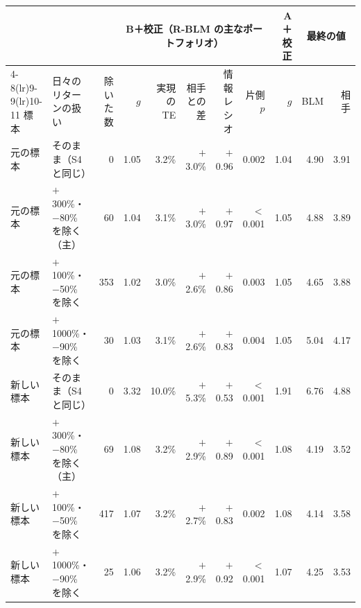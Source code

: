 \begin{tabular}{@{}ll r rrrrr r rr@{}}
\toprule
 & & & \multicolumn{5}{c}{B＋校正（R-BLM の主なポートフォリオ）} & A＋校正 & \multicolumn{2}{c}{最終の値} \\
\cmidrule(lr){4-8}\cmidrule(lr){9-9}\cmidrule(lr){10-11}
標本 & 日々のリターンの扱い & 除いた数 & $g$ & 実現の TE & 相手との差 & 情報レシオ & 片側 $p$ & $g$ & BLM & 相手 \\
\midrule
元の標本 & そのまま（S4 と同じ） & 0 & 1.05 & 3.2\% & $+$3.0\% & $+$0.96 & 0.002 & 1.04 & 4.90 & 3.91 \\
元の標本 & $+$300\%・$-$80\% を除く（主） & 60 & 1.04 & 3.1\% & $+$3.0\% & $+$0.97 & $<$0.001 & 1.05 & 4.88 & 3.89 \\
元の標本 & $+$100\%・$-$50\% を除く & 353 & 1.02 & 3.0\% & $+$2.6\% & $+$0.86 & 0.003 & 1.05 & 4.65 & 3.88 \\
元の標本 & $+$1000\%・$-$90\% を除く & 30 & 1.03 & 3.1\% & $+$2.6\% & $+$0.83 & 0.004 & 1.05 & 5.04 & 4.17 \\
\addlinespace
新しい標本 & そのまま（S4 と同じ） & 0 & 3.32 & 10.0\% & $+$5.3\% & $+$0.53 & $<$0.001 & 1.91 & 6.76 & 4.88 \\
新しい標本 & $+$300\%・$-$80\% を除く（主） & 69 & 1.08 & 3.2\% & $+$2.9\% & $+$0.89 & $<$0.001 & 1.08 & 4.19 & 3.52 \\
新しい標本 & $+$100\%・$-$50\% を除く & 417 & 1.07 & 3.2\% & $+$2.7\% & $+$0.83 & 0.002 & 1.08 & 4.14 & 3.58 \\
新しい標本 & $+$1000\%・$-$90\% を除く & 25 & 1.06 & 3.2\% & $+$2.9\% & $+$0.92 & $<$0.001 & 1.07 & 4.25 & 3.53 \\
\bottomrule
\end{tabular}
